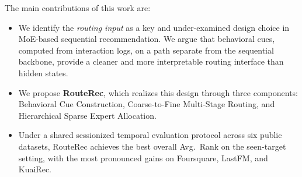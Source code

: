 \documentclass[sigconf,review,anonymous]{acmart}
\begin{document}
The main contributions of this work are:
\begin{itemize}
  \item We identify the \emph{routing input} as a key and under-examined design choice in MoE-based sequential recommendation. We argue that behavioral cues, computed from interaction logs, on a path separate from the sequential backbone, provide a cleaner and more interpretable routing interface than hidden states.
  \item We propose \textbf{RouteRec}, which realizes this design through three components: Behavioral Cue Construction, Coarse-to-Fine Multi-Stage Routing, and Hierarchical Sparse Expert Allocation.
  \item Under a shared sessionized temporal evaluation protocol across six public datasets, RouteRec achieves the best overall Avg.~Rank on the seen-target setting, with the most pronounced gains on Foursquare, LastFM, and KuaiRec.
\end{itemize}

\end{document}
